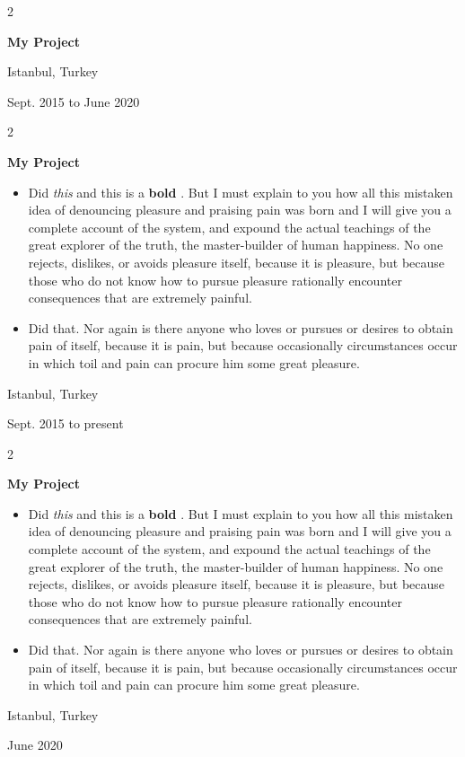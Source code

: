 \documentclass[10pt, letterpaper]{article}
\newenvironment{highlights}{
    \begin{itemize}[
        topsep=0.10 cm,
        parsep=0.10 cm,
        partopsep=0pt,
        itemsep=0pt,
        leftmargin=0.4 cm + 10pt
    ]
}{
    \end{itemize}
} %
\newenvironment{twocolentry}[2][]{
    \onecolentry
    \def\secondColumn{#2}
    \setcolumnwidth{\fill, 4.5 cm}
    \begin{paracol}{2}
}{
    \switchcolumn \raggedleft \secondColumn
    \end{paracol}
    \endonecolentry
} %
\let\hrefWithoutArrow\href
\renewcommand{\href}[2]{\hrefWithoutArrow{#1}{\mbox{\ifthenelse{\equal{#2}{}}{ }{#2 }\raisebox{.15ex}{\footnotesize \faExternalLink*}}}}
\begin{document}
        \vspace{0.2 cm}

        \begin{twocolentry}{
            Istanbul, Turkey

        Sept. 2015 to June 2020
        }
            \textbf{My Project}
        \end{twocolentry}


        \vspace{0.2 cm}

        \begin{twocolentry}{
            Istanbul, Turkey

        Sept. 2015 to present
        }
            \textbf{My Project}
            \begin{highlights}
                \item Did \textit{this} and this is a \textbf{bold} \href{https://example.com}{link}. But I must explain to you how all this mistaken idea of denouncing pleasure and praising pain was born and I will give you a complete account of the system, and expound the actual teachings of the great explorer of the truth, the master-builder of human happiness. No one rejects, dislikes, or avoids pleasure itself, because it is pleasure, but because those who do not know how to pursue pleasure rationally encounter consequences that are extremely painful.
                \item Did that. Nor again is there anyone who loves or pursues or desires to obtain pain of itself, because it is pain, but because occasionally circumstances occur in which toil and pain can procure him some great pleasure.
            \end{highlights}
        \end{twocolentry}


        \vspace{0.2 cm}

        \begin{twocolentry}{
            Istanbul, Turkey

        June 2020
        }
            \textbf{My Project}
            \begin{highlights}
                \item Did \textit{this} and this is a \textbf{bold} \href{https://example.com}{link}. But I must explain to you how all this mistaken idea of denouncing pleasure and praising pain was born and I will give you a complete account of the system, and expound the actual teachings of the great explorer of the truth, the master-builder of human happiness. No one rejects, dislikes, or avoids pleasure itself, because it is pleasure, but because those who do not know how to pursue pleasure rationally encounter consequences that are extremely painful.
                \item Did that. Nor again is there anyone who loves or pursues or desires to obtain pain of itself, because it is pain, but because occasionally circumstances occur in which toil and pain can procure him some great pleasure.
            \end{highlights}
        \end{twocolentry}
\end{document}

